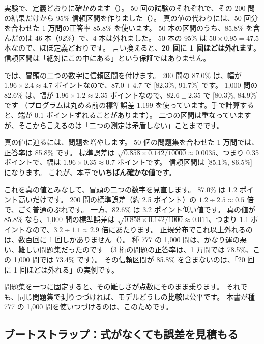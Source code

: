 実験で、定義どおりに確かめます（）。
50 回の試験のそれぞれで、その 200 問の結果だけから 95\% 信頼区間を作りました（）。
真の値の代わりには、50 回分を合わせた 1 万問の正答率 85.8\% を使います。
50 本の区間のうち、85.8\% を含んだのは 46 本（92\%）で、4 本は外れました。
50 本の 95\% は $50\times0.95=47.5$ 本なので、ほぼ定義どおりです。
言い換えると、\textbf{20 回に 1 回ほどは外れます}。
信頼区間は「絶対にこの中にある」という保証ではありません。

では、冒頭の二つの数字に信頼区間を付けます。
200 問の 87.0\% は、幅が $1.96\times2.4\approx4.7$ ポイントなので、$87.0\pm4.7$ で [82.3\%, 91.7\%] です。
1,000 問の 82.6\% は、幅が $1.96\times1.2\approx2.35$ ポイントなので、$82.6\pm2.35$ で [80.3\%, 84.9\%] です
（プログラムは丸める前の標準誤差 1.199 を使っています。手で計算すると、端が 0.1 ポイントずれることがあります）。
二つの区間は重なっていますが、そこから言えるのは「二つの測定は矛盾しない」ことまでです。

真の値に迫るには、問題を増やします。
50 個の問題集を合わせた 1 万問では、正答率は 85.8\% です。
標準誤差は $\sqrt{0.858\times0.142/10000}\approx0.0035$、つまり 0.35 ポイントで、幅は $1.96\times0.35\approx0.7$ ポイントです。
信頼区間は [85.1\%, 86.5\%] になります。
これが、本章で\textbf{いちばん確かな値}です。

これを真の値とみなして、冒頭の二つの数字を見直します。
87.0\% は 1.2 ポイント高いだけです。
200 問の標準誤差（約 2.5 ポイント）の $1.2\div2.5\approx0.5$ 倍で、ごく普通のぶれです。
一方、82.6\% は 3.2 ポイント低い値です。
真の値が 85.8\% なら、1,000 問の標準誤差は $\sqrt{0.858\times0.142/1000}\approx0.011$、つまり 1.1 ポイントなので、$3.2\div1.1\approx2.9$ 倍にあたります。
正規分布でこれ以上外れるのは、数百回に 1 回しかありません（）。
種 777 の 1,000 問は、かなり運の悪い、難しい問題集だったのです
（3 桁の問題の正答率は、1 万問では 78.5\%、この 1,000 問では 73.4\% です）。
その信頼区間が 85.8\% を含まないのは、「20 回に 1 回ほどは外れる」の実例です。

問題集を一つに固定すると、その難しさが点数にそのまま乗ります。
それでも、同じ問題集で測りつづければ、モデルどうしの\textbf{比較}は公平です。
本書が種 777 の 1,000 問を使いつづけるのは、このためです。

\subsection*{ブートストラップ：式がなくても誤差を見積もる}

